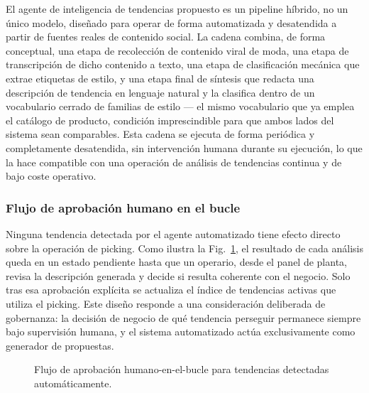 \documentclass[conference]{IEEEtran}
\begin{document}
El agente de inteligencia de tendencias propuesto es un pipeline híbrido,
no un único modelo, diseñado para operar de forma automatizada y
desatendida a partir de fuentes reales de contenido social. La cadena
combina, de forma conceptual, una etapa de recolección de contenido viral de
moda, una etapa de transcripción de dicho contenido a texto, una etapa de
clasificación mecánica que extrae etiquetas de estilo, y una etapa final de
síntesis que redacta una descripción de tendencia en lenguaje natural y la
clasifica dentro de un vocabulario cerrado de familias de estilo --- el
mismo vocabulario que ya emplea el catálogo de producto, condición
imprescindible para que ambos lados del sistema sean comparables. Esta
cadena se ejecuta de forma periódica y completamente desatendida, sin
intervención humana durante su ejecución, lo que la hace compatible con una
operación de análisis de tendencias continua y de bajo coste operativo.

\subsubsection{Flujo de aprobación humano en el bucle}

Ninguna tendencia detectada por el agente automatizado tiene efecto directo
sobre la operación de picking. Como ilustra la Fig.~\ref{fig:approval}, el
resultado de cada análisis queda en un estado pendiente hasta que un
operario, desde el panel de planta, revisa la descripción generada y decide
si resulta coherente con el negocio. Solo tras esa aprobación explícita se
actualiza el índice de tendencias activas que utiliza el picking. Este
diseño responde a una consideración deliberada de gobernanza: la decisión de
negocio de qué tendencia perseguir permanece siempre bajo supervisión
humana, y el sistema automatizado actúa exclusivamente como generador de
propuestas.

\begin{figure}[!t]
\centering
{}
\caption{Flujo de aprobación humano-en-el-bucle para tendencias detectadas
automáticamente.}
\label{fig:approval}
\end{figure}
\end{document}
